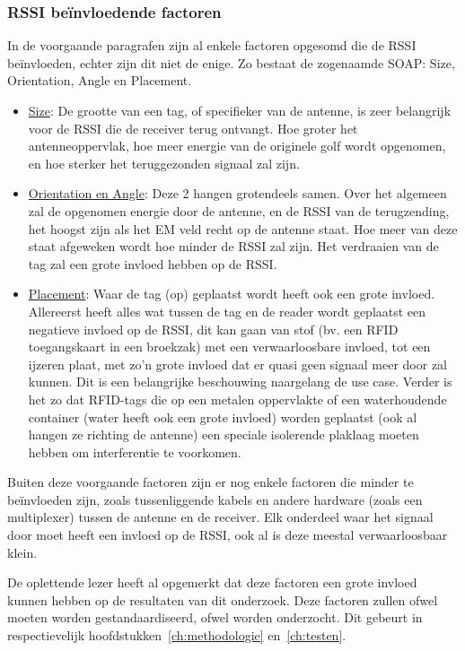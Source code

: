 \subsubsection{RSSI beïnvloedende factoren}
In de voorgaande paragrafen zijn al enkele factoren opgesomd die de RSSI beïnvloeden, echter zijn dit niet de enige. Zo bestaat de zogenaamde SOAP: Size, Orientation, Angle en Placement.
\begin{itemize}
	\item \underline{Size}:
	De grootte van een tag, of specifieker van de antenne, is zeer belangrijk voor de RSSI die de receiver terug ontvangt. Hoe groter het antenneoppervlak, hoe meer energie van de originele golf wordt opgenomen, en hoe sterker het teruggezonden signaal zal zijn.
	\item \underline{Orientation en Angle}:
	Deze 2 hangen grotendeels samen. Over het algemeen zal de opgenomen energie door de antenne, en de RSSI van de terugzending, het hoogst zijn als het EM veld recht op de antenne staat. Hoe meer van deze staat afgeweken wordt hoe minder de RSSI zal zijn. Het verdraaien van de tag zal een grote invloed hebben op de RSSI. 
	\item \underline{Placement}:
	Waar de tag (op) geplaatst wordt heeft ook een grote invloed. Allereerst heeft alles wat tussen de tag en de reader wordt geplaatst een negatieve invloed op de RSSI, dit kan gaan van stof (bv. een RFID toegangskaart in een broekzak) met een verwaarloosbare invloed, tot een ijzeren plaat, met zo'n grote invloed dat er quasi geen signaal meer door zal kunnen. Dit is een belangrijke beschouwing naargelang de use case. Verder is het zo dat RFID-tags die op een metalen oppervlakte of een waterhoudende container (water heeft ook een grote invloed) worden geplaatst (ook al hangen ze richting de antenne) een speciale isolerende plaklaag moeten hebben om interferentie te voorkomen.
\end{itemize}

Buiten deze voorgaande factoren zijn er nog enkele factoren die minder te beïnvloeden zijn, zoals tussenliggende kabels en andere hardware (zoals een multiplexer) tussen de antenne en de receiver. Elk onderdeel waar het signaal door moet heeft een invloed op de RSSI, ook al is deze meestal verwaarloosbaar klein.\autocite{Armstrong2013}

De oplettende lezer heeft al opgemerkt dat deze factoren een grote invloed kunnen hebben op de resultaten van dit onderzoek. Deze factoren zullen ofwel moeten worden gestandaardiseerd, ofwel worden onderzocht. Dit gebeurt in respectievelijk hoofdstukken~\ref{ch:methodologie} en~\ref{ch:testen}.

